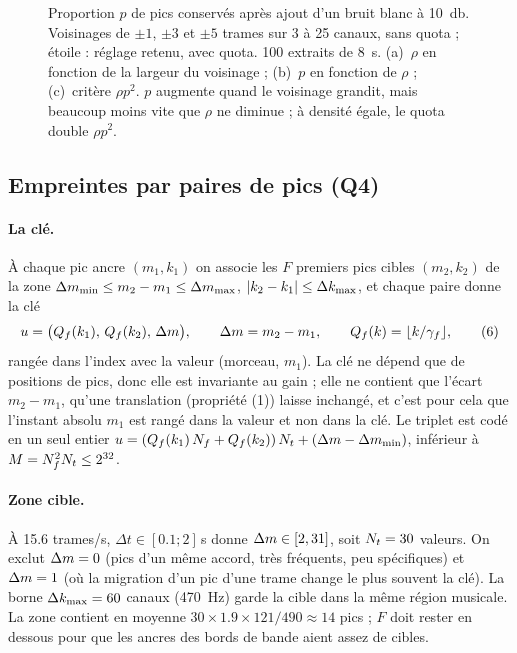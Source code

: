 \begin{figure}[t]
  \centering
  \caption{Proportion $p$ de pics conservés après ajout d'un bruit blanc à
  \qty{10}{\decibel}. Voisinages de $\pm 1$, $\pm 3$ et $\pm 5$ trames sur 3 à 25 canaux,
  sans quota ; étoile : réglage retenu, avec quota. 100 extraits de \qty{8}{\second}.
  (a)~$\rho$ en fonction de la largeur du voisinage ; (b)~$p$ en fonction de $\rho$ ;
  (c)~critère $\rho p^2$. $p$ augmente quand le voisinage grandit, mais beaucoup moins vite
  que $\rho$ ne diminue ; à densité égale, le quota double $\rho p^2$.}
  \label{fig-p-rho}
\end{figure}

\subsection{Empreintes par paires de pics (Q4)}
\label{sec-empreintes}

\paragraph{La clé.} À chaque pic ancre $(m_1,k_1)$ on associe les $F$ premiers pics cibles
$(m_2,k_2)$ de la zone $\Delta m_{\min} \le m_2 - m_1 \le \Delta m_{\max}$, $|k_2 - k_1| \le \Delta k_{\max}$,
et chaque paire donne la clé
\begin{equation}
  u = \bigl(Q_f(k_1),\, Q_f(k_2),\, \Delta m\bigr), \qquad \Delta m = m_2 - m_1, \qquad Q_f(k) = \lfloor k/\gamma_f \rfloor ,
  \tag{6}
\end{equation}
rangée dans l'index avec la valeur (morceau, $m_1$). La clé ne dépend que de positions de
pics, donc elle est invariante au gain ; elle ne contient que l'écart $m_2 - m_1$, qu'une
translation (propriété (1)) laisse inchangé, et c'est pour cela que l'instant absolu $m_1$
est rangé dans la valeur et non dans la clé. Le triplet est codé en un seul entier
$u = (Q_f(k_1)\,N_f + Q_f(k_2))\,N_t + (\Delta m - \Delta m_{\min})$, inférieur à
$M = N_f^2N_t \le 2^{32}$.

\paragraph{Zone cible.} À \num{15.6} trames/s, $\Delta t \in [\num{0.1} ; 2]$\,s donne
$\Delta m \in [2, 31]$, soit $N_t = 30$ valeurs. On exclut $\Delta m = 0$ (pics d'un même accord, très
fréquents, peu spécifiques) et $\Delta m = 1$ (où la migration d'un pic d'une trame change le plus
souvent la clé). La borne $\Delta k_{\max} = 60$ canaux (\qty{470}{\hertz}) garde la cible dans la
même région musicale. La zone contient en moyenne
$30 \times \num{1.9} \times 121/490 \approx 14$ pics ; $F$ doit rester en dessous pour que les
ancres des bords de bande aient assez de cibles.

